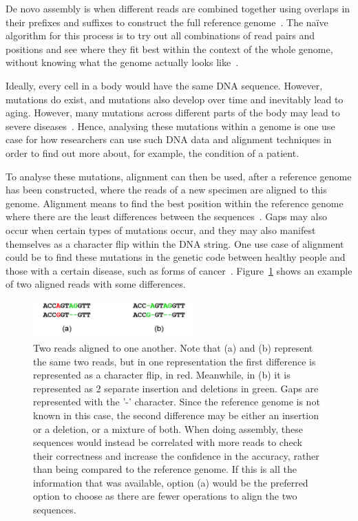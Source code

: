 De novo assembly is when different reads are combined together using overlaps in their prefixes and suffixes to construct the full reference genome~\cite{DeNovoAssembly}.
The na\"ive algorithm for this process is to try out all combinations of read pairs and positions and see where they fit best within the context of the whole genome, without knowing what the genome actually looks like~\cite{EulerianPath}.

Ideally, every cell in a body would have the same DNA sequence.
However, mutations do exist, and mutations also develop over time and inevitably lead to aging.
However, many mutations across different parts of the body may lead to severe diseases~\cite{Mutations}.
Hence, analysing these mutations within a genome is one use case for how researchers can use such DNA data and alignment techniques in order to find out more about, for example, the condition of a patient.

To analyse these mutations, alignment can then be used, after a reference genome has been constructed, where the reads of a new specimen are aligned to this genome.
Alignment means to find the best position within the reference genome where there are the least differences between the sequences~\cite{Alignment}.
Gaps may also occur when certain types of mutations occur, and they may also manifest themselves as a character flip within the DNA string.
One use case of alignment could be to find these mutations in the genetic code between healthy people and those with a certain disease, such as forms of cancer~\cite{BreastCancer}.
Figure~\ref{fig:Alignment} shows an example of two aligned reads with some differences.

\begin{figure}[t]
  \centering
  \includegraphics[width=0.55\textwidth]{images/Alignment.png}
  \caption{Two reads aligned to one another. Note that (a) and (b) represent the same two reads, but in one representation the first difference is represented  as a character flip, in red. Meanwhile, in (b) it is represented as 2 separate insertion and deletions in green. Gaps are represented with the '-' character. Since the reference genome is not known in this case, the second difference may be either an insertion or a deletion, or a mixture of both. When doing assembly, these sequences would instead be correlated with more reads to check their correctness and increase the confidence in the accuracy, rather than being compared to the reference genome. If this is all the information that was available, option (a) would be the preferred option to choose as there are fewer operations to align the two sequences.}\label{fig:Alignment}
\end{figure}

